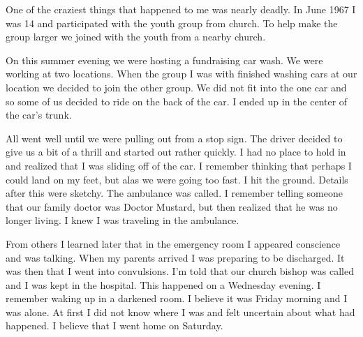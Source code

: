 One of the craziest things that happened to me was nearly deadly.
In June 1967 I was 14 and participated with the youth group from church.
To help make the group larger we joined with the youth from a nearby church.

On this summer evening we were hosting a fundraising car wash.
We were working at two locations.
When the group I was with finished washing cars at our location we decided to join the other group.
We did not fit into the one car and so some of us decided to ride on the back of the car.
I ended up in the center of the car's trunk.

All went well until we were pulling out from a stop sign.
The driver decided to give us a bit of a thrill and started out rather quickly.
I had no place to hold in and realized that I was sliding off of the car.
I remember thinking that perhaps I could land on my feet, but alas we were going too fast.
I hit the ground.
Details after this were sketchy.
The ambulance was called.
I remember telling someone that our family doctor was Doctor Mustard, but then realized that he was no longer living.
I knew I was traveling in the ambulance.

From others I learned later that in the emergency room I appeared conscience and was talking.
When my parents arrived I was preparing to be discharged.
It was then that I went into convulsions.
I'm told that our church bishop was called and I was kept in the hospital.
This happened on a Wednesday evening.
I remember waking up in a darkened room.
I believe it was Friday morning and I was alone.
At first I did not know where I was and felt uncertain about what had happened.
I believe that I went home on Saturday.






